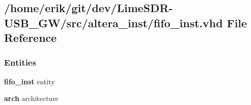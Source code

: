\subsection{/home/erik/git/dev/\+Lime\+S\+D\+R-\/\+U\+S\+B\+\_\+\+G\+W/src/altera\+\_\+inst/fifo\+\_\+inst.vhd File Reference}
\label{altera__inst_2fifo__inst_8vhd}
\subsubsection*{Entities}
\begin{DoxyCompactItemize}
\item 
{\bf fifo\+\_\+inst} entity
\item 
{\bf arch} architecture
\end{DoxyCompactItemize}
